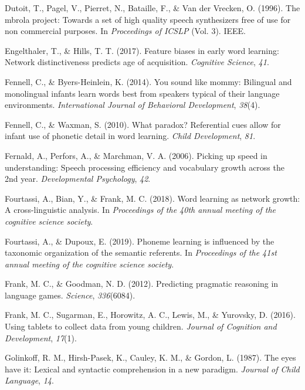 \documentclass[english,,man]{apa6}
\begin{document}
\leavevmode\hypertarget{ref-dutoit1996}{}%
Dutoit, T., Pagel, V., Pierret, N., Bataille, F., \& Van der Vrecken, O. (1996). The mbrola project: Towards a set of high quality speech synthesizers free of use for non commercial purposes. In \emph{Proceedings of ICSLP} (Vol. 3). IEEE.

\leavevmode\hypertarget{ref-engelthaler2017}{}%
Engelthaler, T., \& Hills, T. T. (2017). Feature biases in early word learning: Network distinctiveness predicts age of acquisition. \emph{Cognitive Science}, \emph{41}.

\leavevmode\hypertarget{ref-Fennell2014}{}%
Fennell, C., \& Byers-Heinlein, K. (2014). You sound like mommy: Bilingual and monolingual infants learn words best from speakers typical of their language environments. \emph{International Journal of Behavioral Development}, \emph{38}(4).

\leavevmode\hypertarget{ref-fennell2010}{}%
Fennell, C., \& Waxman, S. (2010). What paradox? Referential cues allow for infant use of phonetic detail in word learning. \emph{Child Development}, \emph{81}.

\leavevmode\hypertarget{ref-fernald2006}{}%
Fernald, A., Perfors, A., \& Marchman, V. A. (2006). Picking up speed in understanding: Speech processing efficiency and vocabulary growth across the 2nd year. \emph{Developmental Psychology}, \emph{42}.

\leavevmode\hypertarget{ref-fourtassi2018}{}%
Fourtassi, A., Bian, Y., \& Frank, M. C. (2018). Word learning as network growth: A cross-linguistic analysis. In \emph{Proceedings of the 40th annual meeting of the cognitive science society}.

\leavevmode\hypertarget{ref-fourtassi2019}{}%
Fourtassi, A., \& Dupoux, E. (2019). Phoneme learning is influenced by the taxonomic organization of the semantic referents. In \emph{Proceedings of the 41st annual meeting of the cognitive science society}.

\leavevmode\hypertarget{ref-frank2012}{}%
Frank, M. C., \& Goodman, N. D. (2012). Predicting pragmatic reasoning in language games. \emph{Science}, \emph{336}(6084).

\leavevmode\hypertarget{ref-frank2016}{}%
Frank, M. C., Sugarman, E., Horowitz, A. C., Lewis, M., \& Yurovsky, D. (2016). Using tablets to collect data from young children. \emph{Journal of Cognition and Development}, \emph{17}(1).

\leavevmode\hypertarget{ref-golinkoff1987}{}%
Golinkoff, R. M., Hirsh-Pasek, K., Cauley, K. M., \& Gordon, L. (1987). The eyes have it: Lexical and syntactic comprehension in a new paradigm. \emph{Journal of Child Language}, \emph{14}.
\end{document}
